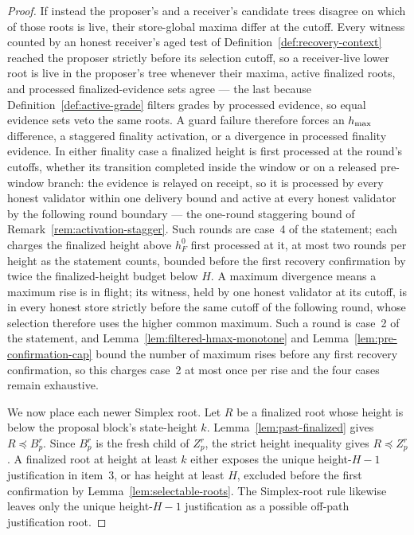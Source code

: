 \begin{proof}
If instead the proposer's and a receiver's candidate trees disagree on
which of those roots is live, their store-global maxima differ at the
cutoff.  Every witness counted by an honest receiver's aged test of
Definition~\ref{def:recovery-context} reached the proposer strictly
before its selection cutoff, so a receiver-live lower root is live in the
proposer's tree whenever their maxima, active finalized roots, and
processed finalized-evidence sets agree --- the last because
Definition~\ref{def:active-grade} filters grades by processed evidence,
so equal evidence sets veto the same roots.
A guard failure therefore forces an \(h_{\max}\) difference, a staggered
finality activation, or a divergence in processed finality evidence.  In
either finality case a finalized height is first processed at the
round's cutoffs, whether its transition completed inside the window or
on a released pre-window branch:
the evidence is relayed on receipt, so it is processed by every honest
validator within one delivery bound and active at every honest validator
by the following round boundary --- the one-round staggering bound of
Remark~\ref{rem:activation-stagger}.  Such rounds are case~4 of the
statement; each charges the finalized height above \(h_F^0\) first
processed at it, at
most two rounds per height as the statement counts, bounded before the
first recovery confirmation by twice the
finalized-height budget below \(H\).  A maximum divergence
means a maximum rise is in flight; its witness, held by one honest
validator at its cutoff, is in every honest store strictly before the same
cutoff of the following round, whose selection therefore uses the higher
common maximum.  Such a round is case~2 of the statement, and
Lemma~\ref{lem:filtered-hmax-monotone} and
Lemma~\ref{lem:pre-confirmation-cap} bound the number of maximum rises
before any first recovery confirmation, so this charges case~2 at most
once per rise and the four cases remain exhaustive.

We now place each newer Simplex root.  Let \(R\) be a finalized root whose
height is below the proposal block's state-height \(k\).
Lemma~\ref{lem:past-finalized} gives \(R\preceq B_p^r\).  Since \(B_p^r\) is
the fresh child of \(Z_p^r\), the strict height inequality gives
\(R\preceq Z_p^r\).  A finalized root at height at least \(k\) either exposes
the unique height-\(H-1\) justification in item~3, or has height at
least \(H\), excluded before the first confirmation by
Lemma~\ref{lem:selectable-roots}.  The
Simplex-root rule likewise leaves only the unique height-\(H-1\)
justification as a possible off-path justification root.


\end{proof}
